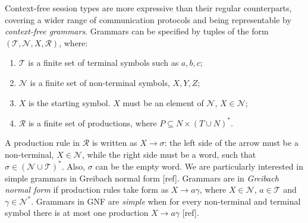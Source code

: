 


Context-free session types are more expressive than their regular counterparts, covering a wider range of communication protocols and being representable by \textit{context-free grammars}.
Grammars can be specified by tuples of the form $(\mathcal{T, N}, X, \mathcal{R})$, where: 
\begin{enumerate}
    \item $\mathcal{T}$ is a finite set of terminal symbols such as $a, b, c$; 
    \item $\mathcal{N}$ is a finite set of non-terminal symbols, $X, Y, Z$;
    \item $X$ is the starting symbol. $X$ must be an element of $\mathcal{N}$, $X\in\mathcal{N}$;
    \item $\mathcal{R}$ is a finite set of productions, where $P \subseteq N \times (T \cup N)^*$. 
\end{enumerate}
A production rule in $\mathcal{R}$ is written as $X \rightarrow \sigma$: the left side of the arrow must be a non-terminal, $X\in\mathcal{N}$, while the right side must be a word, such that $\sigma\in(\mathcal{N}\cup\mathcal{T})^*$. Also, $\sigma$ can be the empty word. We are particularly interested in simple grammars in Greibach normal form [ref]. Grammars are in \textit{Greibach normal form} if production rules take form as $X \rightarrow a\gamma$, where $X\in\mathcal{N}$, $a\in\mathcal{T}$ and $\gamma\in\mathcal{N}^*$. Grammars in GNF are \emph{simple} when for every non-terminal and terminal symbol there is at most one production $X \rightarrow a\gamma$ [ref].

